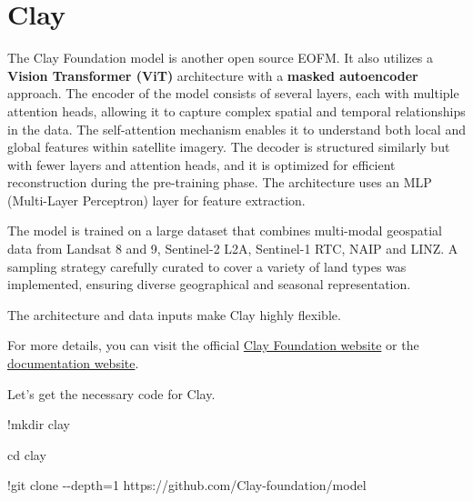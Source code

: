 \documentclass[
  letterpaper,
  DIV=11,
  numbers=noendperiod]{scrreprt}
\newenvironment{Shaded}{\begin{snugshade}}{\end{snugshade}}
\newcommand{\DecValTok}[1]{\textcolor[rgb]{0.68,0.00,0.00}{#1}}
\newcommand{\NormalTok}[1]{\textcolor[rgb]{0.00,0.23,0.31}{#1}}
\newcommand{\OperatorTok}[1]{\textcolor[rgb]{0.37,0.37,0.37}{#1}}
\begin{document}
\section{Clay}\label{clay}

The Clay Foundation model is another open source EOFM. It also utilizes
a \textbf{Vision Transformer (ViT)} architecture with a \textbf{masked
autoencoder} approach. The encoder of the model consists of several
layers, each with multiple attention heads, allowing it to capture
complex spatial and temporal relationships in the data. The
self-attention mechanism enables it to understand both local and global
features within satellite imagery. The decoder is structured similarly
but with fewer layers and attention heads, and it is optimized for
efficient reconstruction during the pre-training phase. The architecture
uses an MLP (Multi-Layer Perceptron) layer for feature extraction.

The model is trained on a large dataset that combines multi-modal
geospatial data from Landsat 8 and 9, Sentinel-2 L2A, Sentinel-1 RTC,
NAIP and LINZ. A sampling strategy carefully curated to cover a variety
of land types was implemented, ensuring diverse geographical and
seasonal representation.

The architecture and data inputs make Clay highly flexible.

For more details, you can visit the official
\href{https://madewithclay.org}{Clay Foundation website} or the
\href{https://clay-foundation.github.io/model/index.html}{documentation
website}.

Let's get the necessary code for Clay.

\begin{Shaded}
\begin{Highlighting}[]
\OperatorTok{!}\NormalTok{mkdir clay}
\end{Highlighting}
\end{Shaded}

\begin{Shaded}
\begin{Highlighting}[]
\NormalTok{cd clay}
\end{Highlighting}
\end{Shaded}

\begin{Shaded}
\begin{Highlighting}[]
\OperatorTok{!}\NormalTok{git clone }\OperatorTok{{-}{-}}\NormalTok{depth}\OperatorTok{=}\DecValTok{1}\NormalTok{ https:}\OperatorTok{//}\NormalTok{github.com}\OperatorTok{/}\NormalTok{Clay}\OperatorTok{{-}}\NormalTok{foundation}\OperatorTok{/}\NormalTok{model}
\end{Highlighting}
\end{Shaded}
\end{document}
